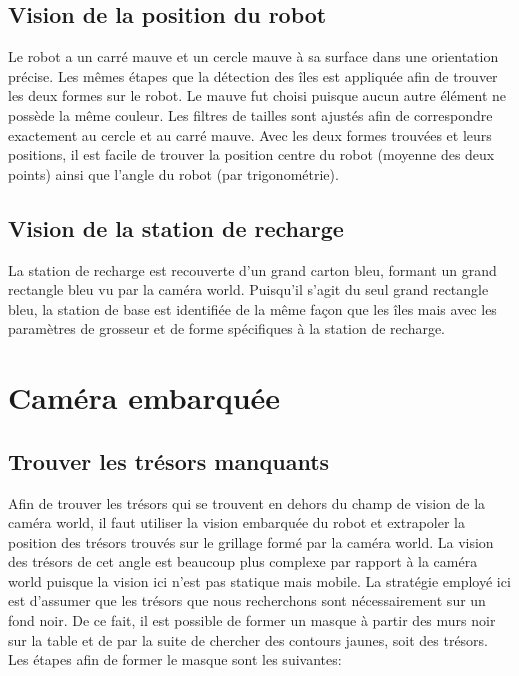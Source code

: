 \subsection{Vision de la position du robot}

Le robot a un carré mauve et un cercle mauve à sa surface dans une orientation précise. Les mêmes étapes que la détection des îles est appliquée afin de trouver les deux formes sur le robot. Le mauve fut choisi puisque aucun autre élément ne possède la même couleur. Les filtres de tailles sont ajustés afin de correspondre exactement au cercle et au carré mauve. Avec les deux formes trouvées et leurs positions, il est facile de trouver la position centre du robot (moyenne des deux points) ainsi que l'angle du robot (par trigonométrie).


\subsection{Vision de la station de recharge}

La station de recharge est recouverte d'un grand carton bleu, formant un grand rectangle bleu vu par la caméra world. Puisqu'il s'agit du seul grand rectangle bleu, la station de base est identifiée de la même façon que les îles mais avec les paramètres de grosseur et de forme spécifiques à la station de recharge.

\section{Caméra embarquée}

\subsection{Trouver les trésors manquants}

Afin de trouver les trésors qui se trouvent en dehors du champ de vision de la caméra world, il faut utiliser la vision embarquée du robot et extrapoler la position des trésors trouvés sur le grillage formé par la caméra world. La vision des trésors de cet angle est beaucoup plus complexe par rapport à la caméra world puisque la vision ici n'est pas statique mais mobile. La stratégie employé ici est d'assumer que les trésors que nous recherchons sont nécessairement sur un fond noir. De ce fait, il est possible de former un masque à partir des murs noir sur la table et de par la suite de chercher des contours jaunes, soit des trésors. Les étapes afin de former le masque sont les suivantes:

